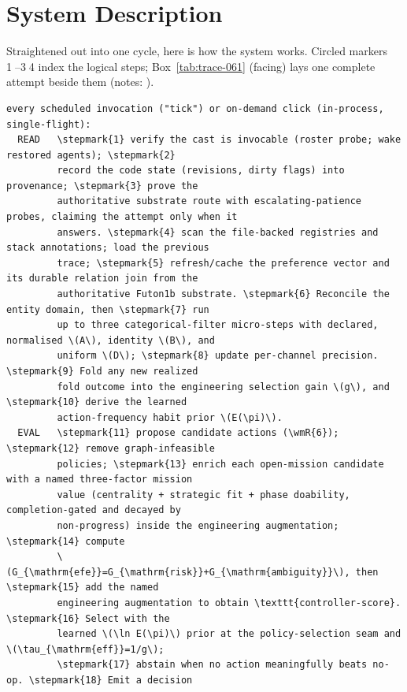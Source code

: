 
\clearpage
\newcommand{\stepmark}[1]{\textcircled{\scriptsize #1}}

\clearpage
\section{System Description}

Straightened out into one cycle, here is how the system works.  Circled markers
\stepmark{1}--\stepmark{34} index the logical steps; Box~\ref{tab:trace-061} (facing) lays one
complete attempt beside them (notes: ).

\begin{Verbatim}[fontsize=\footnotesize,commandchars=\\\{\}]
every scheduled invocation ("tick") or on-demand click (in-process, single-flight):
  READ   \stepmark{1} verify the cast is invocable (roster probe; wake restored agents); \stepmark{2}
         record the code state (revisions, dirty flags) into provenance; \stepmark{3} prove the
         authoritative substrate route with escalating-patience probes, claiming the attempt only when it
         answers. \stepmark{4} scan the file-backed registries and stack annotations; load the previous
         trace; \stepmark{5} refresh/cache the preference vector and its durable relation join from the
         authoritative Futon1b substrate. \stepmark{6} Reconcile the entity domain, then \stepmark{7} run
         up to three categorical-filter micro-steps with declared, normalised \(A\), identity \(B\), and
         uniform \(D\); \stepmark{8} update per-channel precision. \stepmark{9} Fold any new realized
         fold outcome into the engineering selection gain \(g\), and \stepmark{10} derive the learned
         action-frequency habit prior \(E(\pi)\).
  EVAL   \stepmark{11} propose candidate actions (\wmR{6}); \stepmark{12} remove graph-infeasible
         policies; \stepmark{13} enrich each open-mission candidate with a named three-factor mission
         value (centrality + strategic fit + phase doability, completion-gated and decayed by
         non-progress) inside the engineering augmentation; \stepmark{14} compute
         \(G_{\mathrm{efe}}=G_{\mathrm{risk}}+G_{\mathrm{ambiguity}}\), then \stepmark{15} add the named
         engineering augmentation to obtain \texttt{controller-score}. \stepmark{16} Select with the
         learned \(\ln E(\pi)\) prior at the policy-selection seam and \(\tau_{\mathrm{eff}}=1/g\);
         \stepmark{17} abstain when no action meaningfully beats no-op. \stepmark{18} Emit a decision

\end{Verbatim}
